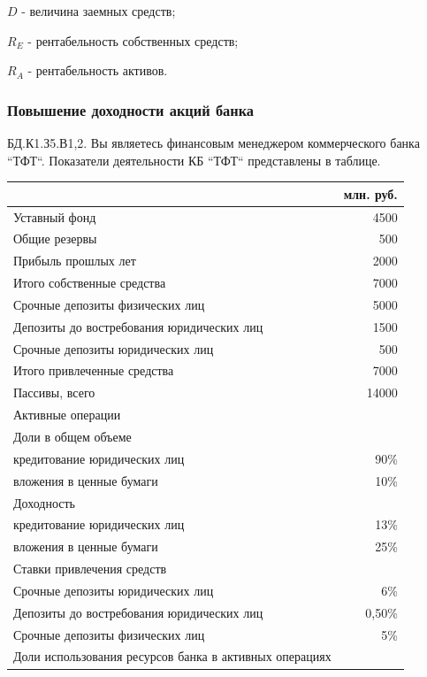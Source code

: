 \documentclass[12pt, table, a4paper,twoside]{exam}
\begin{document}
\begin{questions}
\begin{solution}[12em]
	$D$ - величина заемных средств;
	
	$R_E$ - рентабельность собственных средств;
	
	$R_A$ - рентабельность активов.
	
\end{solution}

\vfill\null\pagebreak
\subsubsection{Повышение доходности акций банка}
\question[20] БД.К1.З5.В1,2. Вы являетесь финансовым менеджером коммерческого банка ``ТФТ``. 
Показатели деятельности КБ ``ТФТ`` представлены в таблице.

		\begin{tabularx}{\linewidth}[b]{@{}>{\raggedright\arraybackslash}Xr@{}}	
		&млн. руб. \\
		\midrule
		Уставный фонд & 4500 \\
		Общие резервы & 500 \\
		Прибыль прошлых лет & 2000 \\
		Итого собственные средства & 7000 \\
		Срочные депозиты физических лиц & 5000 \\
		Депозиты до востребования юридических лиц & 1500 \\
		Срочные депозиты юридических лиц & 500 \\
		Итого привлеченные средства & 7000 \\
		\midrule
		Пассивы, всего & 14000 \\
		\midrule
		Активные операции &  \\
		\midrule
		Доли в общем объеме &  \\
		кредитование юридических лиц & 90\% \\
		вложения в ценные бумаги & 10\% \\
		\midrule
		Доходность &  \\
		кредитование юридических лиц & 13\% \\
		вложения в ценные бумаги & 25\% \\
		\midrule
		Ставки привлечения средств &  \\
		Срочные депозиты юридических лиц & 6\% \\
		Депозиты до востребования юридических лиц & 0,50\% \\
		Срочные депозиты физических лиц & 5\% \\
		\midrule
		Доли использования ресурсов банка в активных операциях &  \\

\end{tabularx}
\end{questions}
\end{document}
